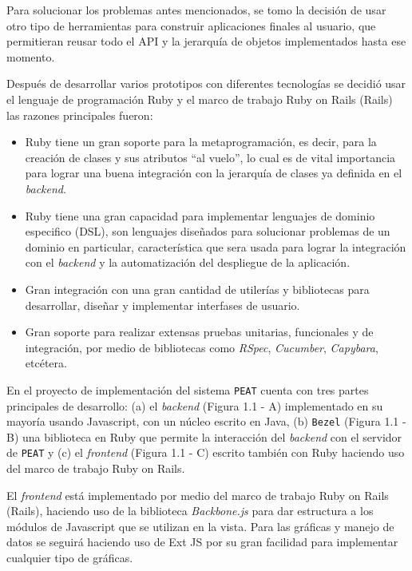 Para solucionar los problemas antes mencionados, se tomo la decisión de
usar otro tipo de herramientas para construir aplicaciones finales al usuario,
que permitieran reusar todo el API y la jerarquía de objetos implementados
hasta ese momento.

Después de desarrollar varios prototipos con diferentes tecnologías se decidió
usar el lenguaje de programación Ruby y el marco de trabajo Ruby on Rails (Rails)
las razones principales fueron:

\begin{itemize}
\item Ruby tiene un gran soporte para la metaprogramación, es decir, para la
  creación de clases y sus atributos ``al vuelo'', lo cual es de vital
  importancia para lograr una buena integración con la jerarquía de clases
  ya definida en el \textit{backend}.
\item Ruby tiene una gran capacidad para implementar lenguajes de dominio
  especifico (DSL), son lenguajes diseñados para solucionar problemas de un dominio
  en particular, característica que sera usada para lograr la integración con el
  \textit{backend} y la automatización del despliegue de la aplicación.
\item Gran integración con una gran cantidad de utilerías y bibliotecas para
  desarrollar, diseñar y implementar interfases de usuario.
\item Gran soporte para realizar extensas pruebas unitarias, funcionales
  y de integración, por medio de bibliotecas como \textit{RSpec}, \textit{Cucumber},
  \textit{Capybara}, etcétera.
\end{itemize}

En el proyecto de implementación del sistema \texttt{PEAT}
cuenta con tres partes principales de desarrollo:
(a) el \textit{backend} (Figura 1.1 - A) implementado en su mayoría usando
Javascript, con un núcleo escrito en Java, (b) \texttt{Bezel} (Figura 1.1 - B)
una biblioteca en Ruby que permite la interacción del \textit{backend}
con el servidor de \texttt{PEAT} y (c) el \textit{frontend} (Figura 1.1 - C) escrito
también con Ruby haciendo uso del marco de trabajo Ruby on Rails.


El \textit{frontend} está implementado por medio del marco de trabajo
Ruby on Rails (Rails), haciendo uso de la biblioteca \textit{Backbone.js}
para dar estructura a los módulos de Javascript que se utilizan en la vista.
Para las gráficas y manejo de datos se seguirá haciendo uso de Ext JS
por su gran facilidad para implementar cualquier tipo de gráficas.

